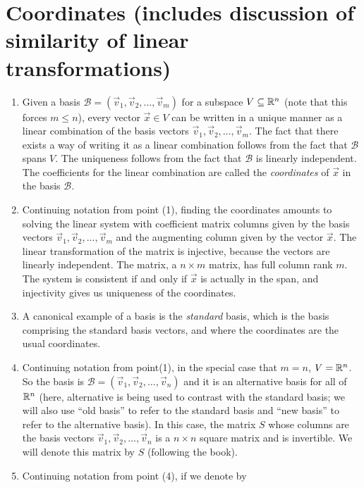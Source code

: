 \documentclass[10pt]{amsart}
\begin{document}
\section{Coordinates (includes discussion of similarity of linear transformations)}

\begin{enumerate}
\item Given a basis $\mathcal{B} =
  (\vec{v}_1,\vec{v}_2,\dots,\vec{v}_m)$ for a subspace $V \subseteq
  \mathbb{R}^n$ (note that this forces $m \le n$), every vector $\vec{x} \in
  V$ can be written in a unique manner as a linear combination of the
  basis vectors $\vec{v}_1,\vec{v}_2,\dots,\vec{v}_m$. The fact that
  there exists a way of writing it as a linear combination follows
  from the fact that $\mathcal{B}$ spans $V$. The uniqueness follows
  from the fact that $\mathcal{B}$ is linearly independent. The
  coefficients for the linear combination are called the {\em
    coordinates} of $\vec{x}$ in the basis $\mathcal{B}$.
\item Continuing notation from point (1), finding the coordinates
  amounts to solving the linear system with coefficient matrix columns
  given by the basis vectors $\vec{v}_1,\vec{v}_2,\dots,\vec{v}_m$ and
  the augmenting column given by the vector $\vec{x}$. The linear
  transformation of the matrix is injective, because the vectors are
  linearly independent. The matrix, a $n \times m$ matrix, has full
  column rank $m$. The system is consistent if and only if $\vec{x}$ is
  actually in the span, and injectivity gives us uniqueness of the
  coordinates.
\item A canonical example of a basis is the {\em standard} basis, which
  is the basis comprising the standard basis vectors, and where the
  coordinates are the usual coordinates.
\item Continuing notation from point(1), in the special case that $m =
  n$, $V = \mathbb{R}^n$. So the basis is $\mathcal{B} =
  (\vec{v}_1,\vec{v}_2,\dots,\vec{v}_n)$ and it is an alternative
  basis for all of $\mathbb{R}^n$ (here, alternative is being used to contrast
  with the standard basis; we will also use ``old basis'' to refer to
  the standard basis and ``new basis'' to refer to the alternative
  basis). In this case, the matrix $S$ whose columns are the basis
  vectors $\vec{v}_1, \vec{v}_2, \dots, \vec{v}_n$ is a $n \times n$
  square matrix and is invertible. We will denote this matrix by $S$
  (following the book).
\item Continuing notation from point (4), if we denote by

\end{enumerate}
\end{document}
